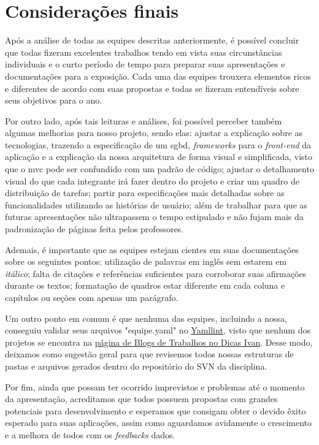 \chapter{Considerações finais}
Após a análise de todas as equipes descritas anteriormente, é possível concluir que todas fizeram excelentes trabalhos tendo em vista suas circunstâncias individuais e o curto período de tempo para preparar suas apresentações e documentações para a exposição. Cada uma das equipes trouxera elementos ricos e diferentes de acordo com suas propostas e todas se fizeram entendíveis sobre seus objetivos para o ano.

Por outro lado, após tais leituras e análises, foi possível perceber também algumas melhorias para nosso projeto, sendo elas: ajustar a explicação sobre as tecnologias, trazendo a especificação de um \acs{sgbd}, \textsl{frameworks} para o \textsl{front-end} da aplicação e a explicação da nossa arquitetura de forma visual e simplificada, visto que o \acs{mvc} pode ser confundido com um padrão de código; ajustar o detalhamento visual do que cada integrante irá fazer dentro do projeto e criar um quadro de distribuição de tarefas; partir para especificações mais detalhadas sobre as funcionalidades utilizando as histórias de usuário; além de trabalhar para que as futuras apresentações não ultrapassem o tempo estipulado e não fujam mais da padronização de páginas feita pelos professores.

Ademais, é importante que as equipes estejam cientes em suas documentações sobre os seguintes pontos: utilização de palavras em inglês sem estarem em \textsl{itálico}; falta de citações e referências suficientes para corroborar suas afirmações durante os textos; formatação de quadros estar diferente em cada coluna e capítulos ou seções com apenas um parágrafo. 

Um outro ponto em comum é que nenhuma das equipes, incluindo a nossa, conseguiu validar seus arquivos "equipe.yaml" no \href{https://yamllint.readthedocs.io/en/stable/}{Yamllint}, visto que nenhum dos projetos se encontra na \href{https://dicas.ivanfm.com/aulas/blogs-de-trabalhos.html}{página de Blogs de Trabalhos no Dicas Ivan}. Desse modo, deixamos como sugestão geral para que revisemos todos nossas estruturas de pastas e arquivos gerados dentro do repositório do SVN da disciplina.

Por fim, ainda que possam ter ocorrido imprevistos e problemas até o momento da apresentação, acreditamos que todos possuem propostas com grandes potenciais para desenvolvimento e esperamos que consigam obter o devido êxito esperado para suas aplicações, assim como aguardamos avidamente o crescimento e a melhora de todos com os \textsl{feedbacks} dados.